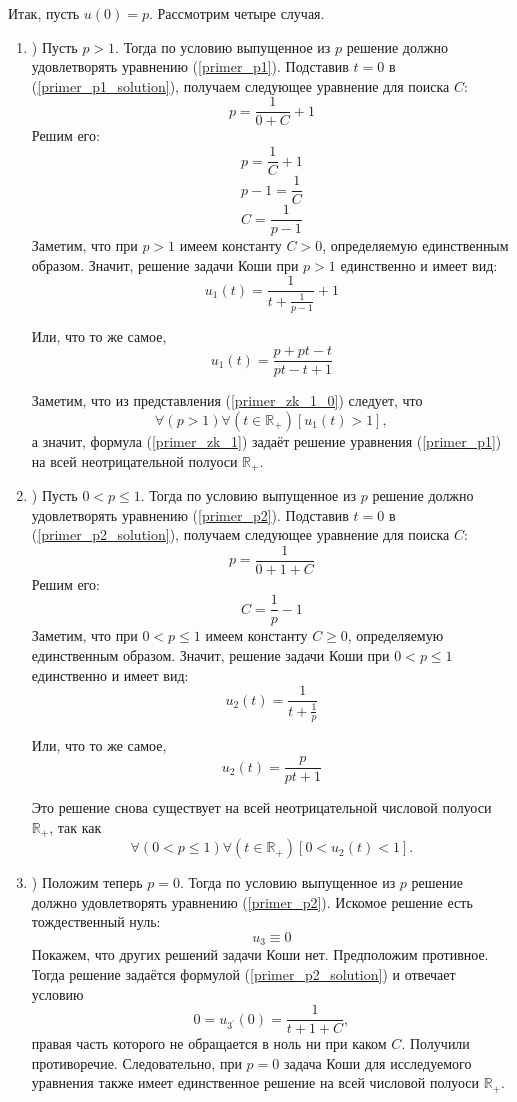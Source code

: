Итак, пусть $u(0) = p$.
Рассмотрим четыре случая.

\begin{enumerate}

\item)
Пусть $p>1$.
Тогда по условию выпущенное из $p$ решение должно удовлетворять уравнению (\ref{primer_p1}).
Подставив $t=0$ в (\ref{primer_p1_solution}), получаем следующее уравнение для поиска $C$:
$$
	p=\frac{1}{0+C}+1
$$
Решим его:
$$
	p=\frac{1}{C}+1
$$
$$
	p-1=\frac{1}{C}
$$
$$
	C=\frac{1}{p-1}
$$
Заметим, что при $p>1$ имеем константу $C>0$, определяемую единственным образом.
Значит, решение задачи Коши при $p>1$ единственно и имеет вид:
\begin{equation}\label{primer_zk_1_0}
	u_1(t)=\frac{1}{t+\frac{1}{p-1}}+1
\end{equation}

Или, что то же самое,
\begin{equation}\label{primer_zk_1}
	u_1(t)=\frac{p+pt-t}{pt-t+1}
\end{equation}

Заметим, что из представления (\ref{primer_zk_1_0}) следует, что
$$
	\forall(p>1)\forall\left(t \in \mathbb{R}_+\right)\left[u_1(t) > 1\right],
$$
а значит, формула (\ref{primer_zk_1}) задаёт решение уравнения (\ref{primer_p1}) на всей неотрицательной полуоси $\mathbb{R}_+$.

\item)
Пусть $0<p \leq 1$.
Тогда по условию выпущенное из $p$ решение должно удовлетворять уравнению (\ref{primer_p2}).
Подставив $t=0$ в (\ref{primer_p2_solution}), получаем следующее уравнение для поиска $C$:
$$
	p=\frac{1}{0+1+C}
$$
Решим его:
$$
	C=\frac{1}{p}-1
$$
Заметим, что при $0<p \leq 1$ имеем константу $C \geq 0$, определяемую единственным образом.
Значит, решение задачи Коши при $0<p \leq 1$ единственно и имеет вид:
\begin{equation}\label{primer_zk_2_0}
	u_2(t)=\frac{1}{t+\frac{1}{p}}
\end{equation}

Или, что то же самое,
\begin{equation}\label{primer_zk_2}
	u_2(t)=\frac{p}{pt+1}
\end{equation}

Это решение снова существует на всей неотрицательной числовой полуоси $\mathbb{R}_+$, так как
$$
	\forall(0<p \leq 1)\forall\left(t \in \mathbb{R}_+\right)\left[0 < u_2(t) < 1\right].
$$

\item)
Положим теперь $p=0$.
Тогда по условию выпущенное из $p$ решение должно удовлетворять уравнению (\ref{primer_p2}).
Искомое решение есть тождественный нуль:
\begin{equation}\label{primer_zk_3}
	u_3 \equiv 0
\end{equation}
Покажем, что других решений задачи Коши нет.
Предположим противное.
Тогда решение задаётся формулой (\ref{primer_p2_solution}) и отвечает условию
$$
	0=u_{3^{'}}(0)=\frac{1}{t+1+C},
$$
правая часть которого не обращается в ноль ни при каком $C$.
Получили противоречие.
Следовательно, при $p=0$ задача Коши для исследуемого уравнения также имеет единственное решение на всей числовой полуоси $\mathbb{R}_+$.


\end{enumerate}
